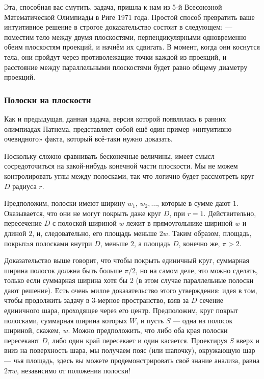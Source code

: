 Эта, способная вас смутить, задача, пришла к нам из 5-й Всесоюзной Математической Олимпиады в Риге 1971 года.
Простой способ превратить ваше интуитивное решение в строгое доказательство состоит в следующем: --- поместим тело между двумя плоскостями, перпендикулярными одновременно обеим плоскостям проекций, и начнём их сдвигать.
В  момент, когда они коснутся тела, они пройдут через противолежащие точки каждой из проекций, и расстояние между параллельными плоскостями будет равно общему диаметру проекций.
\heart

\subsubsection*{Полоски на плоскости}%

Как и предыдущая, данная задача, версия которой появлялась в ранних олимпиадах Патнема, представляет собой ещё один пример «интуитивно очевидного» факта, который всё-таки нужно доказать.

\medskip

Поскольку сложно сравнивать бесконечные величины, имеет смысл сосредоточиться на какой-нибудь конечной части плоскости.
Мы не можем контролировать углы между полосками, так что логично будет рассмотреть круг $D$ радиуса $r$.

Предположим, полоски имеют ширину $w_1$, $w_2,\dots$, которые в сумме дают $1$.
Оказывается, что они не могут покрыть даже круг $D$, при $r=1$.
Действительно, пересечение $D$ с полоской шириной $w$ лежит в прямоугольнике шириной $w$ и длиной $2$, и, следовательно, его площадь меньше $2w$.
Таким образом, площадь, покрытaя полосками внутри $D$, меньше $2$, а площадь $D$, конечно же, $\pi>2$.
\heart 

Доказательство выше говорит, что чтобы покрыть единичный круг, суммарная ширина полосок должна быть больше $\pi/2$, но на самом деле, это можно сделать, только если суммарная ширина хотя бы 2 (в этом случае параллельные полоски дают решение).
Есть очень милое доказательство этого утверждения:
идея в том, чтобы продолжить задачу в 3-мерное пространство, взяв за $D$ сечение единичного шара, проходящее через его центр.
Предположим, круг покрыт полосками, суммарная ширина которых $W$, и пусть $S$ --- одна из полосок шириной, скажем, $w$.
Можно предположить, что либо оба края полоски пересекают $D$, либо один край пересекает и один касается.
Проектируя $S$ вверх и вниз на поверхность шара, мы получаем пояс (или шапочку),
окружающую шар --- чья площадь, здесь вы можете продемонстрировать своё знание анализа, равна 
$2\pi w$, независимо от положения полоски!

